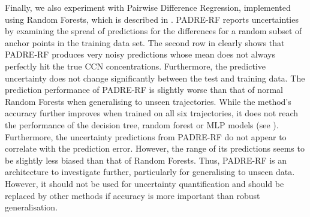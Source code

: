 Finally, we also experiment with Pairwise Difference Regression, implemented using Random Forests, which is described in . PADRE-RF reports uncertainties by examining the spread of predictions for the differences for a random subset of anchor points in the training data set. The second row in  clearly shows that PADRE-RF produces very noisy predictions whose mean does not always perfectly hit the true CCN concentrations. Furthermore, the predictive uncertainty does not change significantly between the test and training data. The prediction performance of PADRE-RF is slightly worse than that of normal Random Forests when generalising to unseen trajectories. While the method's accuracy further improves when trained on all six trajectories, it does not reach the performance of the decision tree, random forest or MLP models (see ). Furthermore, the uncertainty predictions from PADRE-RF do not appear to correlate with the prediction error. However, the range of its predictions seems to be slightly less biased than that of Random Forests. Thus, PADRE-RF is an architecture to investigate further, particularly for generalising to unseen data. However, it should not be used for uncertainty quantification and should be replaced by other methods if accuracy is more important than robust generalisation.

